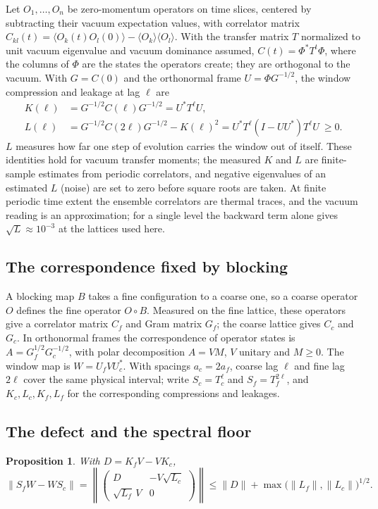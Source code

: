 \documentclass[11pt]{article}
\newtheorem{proposition}[lemma]{Proposition}
\begin{document}
Let $O_1,\dots,O_n$ be zero-momentum operators on time slices, centered by subtracting their vacuum
expectation values, with correlator matrix $C_{kl}(t)=\langle O_k(t)O_l(0)\rangle-\langle O_k\rangle\langle
O_l\rangle$. With the transfer matrix $T$ normalized to unit vacuum eigenvalue and vacuum dominance
assumed, $C(t)=\Phi^*T^t\Phi$, where the columns of $\Phi$ are the states the operators create; they are
orthogonal to the vacuum. With $G=C(0)$ and the orthonormal frame $U=\Phi G^{-1/2}$, the window
compression and leakage at lag $\ell$ are
\begin{align}
 K(\ell)&=G^{-1/2}C(\ell)G^{-1/2}=U^*T^\ell U,\\
 L(\ell)&=G^{-1/2}C(2\ell)G^{-1/2}-K(\ell)^2=U^*T^\ell(I-UU^*)T^\ell U\ \ge 0 .
\end{align}
$L$ measures how far one step of evolution carries the window out of itself. These identities hold for
vacuum transfer moments; the measured $K$ and $L$ are finite-sample estimates from periodic correlators,
and negative eigenvalues of an estimated $L$ (noise) are set to zero before square roots are taken. At
finite periodic time extent the ensemble correlators are thermal traces, and the vacuum reading is an
approximation; for a single level the backward term alone gives $\sqrt{L}\approx10^{-3}$ at the lattices
used here.

\subsection{The correspondence fixed by blocking}

A blocking map $B$ takes a fine configuration to a coarse one, so a coarse operator $O$ defines the fine
operator $O\circ B$. Measured on the fine lattice, these operators give a correlator matrix $C_f$ and Gram
matrix $G_f$; the coarse lattice gives $C_c$ and $G_c$. In orthonormal frames the correspondence of
operator states is $A=G_f^{1/2}G_c^{-1/2}$, with polar decomposition $A=VM$, $V$ unitary and $M\ge0$. The
window map is $W=U_fVU_c^*$. With spacings $a_c=2a_f$, coarse lag $\ell$ and fine lag $2\ell$ cover the same
physical interval; write $S_c=T_c^{\ell}$ and $S_f=T_f^{2\ell}$, and $K_c,L_c,K_f,L_f$ for the corresponding
compressions and leakages.

\subsection{The defect and the spectral floor}

\begin{proposition}\label{prop:defect}
With $D=K_fV-VK_c$,
\begin{equation}
 \|S_fW-WS_c\|=\left\|\begin{pmatrix} D & -V\sqrt{L_c}\\ \sqrt{L_f}\,V & 0\end{pmatrix}\right\|
 \le \|D\|+\max\bigl(\|L_f\|,\|L_c\|\bigr)^{1/2}.
\end{equation}
\end{proposition}
\end{document}
